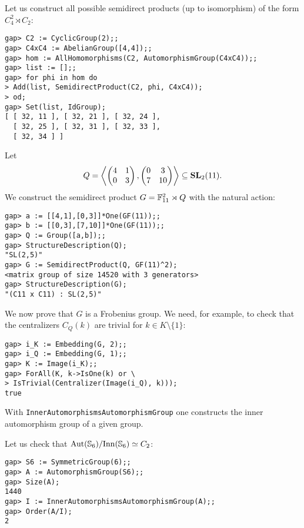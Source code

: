 \begin{example}
    Let us construct all possible semidirect 
    products (up to isomorphism) of the form $C_4^2\rtimes C_2$:
\begin{lstlisting}
gap> C2 := CyclicGroup(2);;
gap> C4xC4 := AbelianGroup([4,4]);;
gap> hom := AllHomomorphisms(C2, AutomorphismGroup(C4xC4));;
gap> list := [];;
gap> for phi in hom do
> Add(list, SemidirectProduct(C2, phi, C4xC4));
> od;
gap> Set(list, IdGroup);
[ [ 32, 11 ], [ 32, 21 ], [ 32, 24 ],
  [ 32, 25 ], [ 32, 31 ], [ 32, 33 ],
  [ 32, 34 ] ]
\end{lstlisting}
\end{example}

\begin{example}
    Let
    \[
    Q=\left\langle\begin{pmatrix}
    4&1\\
    0&3\end{pmatrix},
    \begin{pmatrix}
        0&3\\
        7&10
    \end{pmatrix}\right\rangle\subseteq\mathbf{SL}_2(11).
    \]
    We construct the semidirect 
    product $G=\mathbb{F}_{11}^2\rtimes Q$ with the natural action:
\begin{lstlisting}
gap> a := [[4,1],[0,3]]*One(GF(11));;
gap> b := [[0,3],[7,10]]*One(GF(11));;
gap> Q := Group([a,b]);;
gap> StructureDescription(Q);
"SL(2,5)"
gap> G := SemidirectProduct(Q, GF(11)^2);
<matrix group of size 14520 with 3 generators>
gap> StructureDescription(G);
"(C11 x C11) : SL(2,5)"
\end{lstlisting}
We now prove that $G$ is a Frobenius group. We need, for example, 
to check that the centralizers $C_Q(k)$ are trivial for $k\in K\setminus\{1\}$:
\begin{lstlisting}
gap> i_K := Embedding(G, 2);;
gap> i_Q := Embedding(G, 1);;
gap> K := Image(i_K);;
gap> ForAll(K, k->IsOne(k) or \ 
> IsTrivial(Centralizer(Image(i_Q), k)));
true
\end{lstlisting}
\end{example}


With \lstinline{InnerAutomorphismsAutomorphismGroup} one constructs the inner
automorphism group of a given group.

\begin{example}
Let us check that $\operatorname{Aut}(\mathbb{S}_6)/\mathrm{Inn}(\mathbb{S}_6)\simeq C_2$: 
\begin{lstlisting}
gap> S6 := SymmetricGroup(6);;
gap> A := AutomorphismGroup(S6);;
gap> Size(A);
1440
gap> I := InnerAutomorphismsAutomorphismGroup(A);;
gap> Order(A/I);
2
\end{lstlisting}
\end{example}

